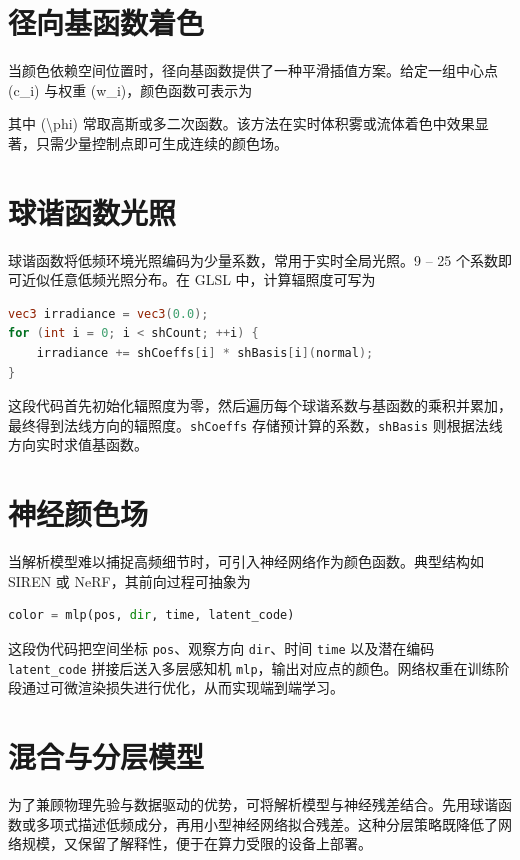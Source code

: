 \section{径向基函数着色}
当颜色依赖空间位置时，径向基函数提供了一种平滑插值方案。给定一组中心点 (c\_{}i) 与权重 (w\_{}i)，颜色函数可表示为\par
[ C(p) = \textbackslash{}sum\_{}\{{}i\}{} w\_{}i \textbackslash{}phi(|p - c\_{}i|) ]\par
其中 (\textbackslash{}phi) 常取高斯或多二次函数。该方法在实时体积雾或流体着色中效果显著，只需少量控制点即可生成连续的颜色场。\par
\section{球谐函数光照}
球谐函数将低频环境光照编码为少量系数，常用于实时全局光照。9 – 25 个系数即可近似任意低频光照分布。在 GLSL 中，计算辐照度可写为\par
\begin{lstlisting}[language=glsl]
vec3 irradiance = vec3(0.0);
for (int i = 0; i < shCount; ++i) {
    irradiance += shCoeffs[i] * shBasis[i](normal);
}
\end{lstlisting}
这段代码首先初始化辐照度为零，然后遍历每个球谐系数与基函数的乘积并累加，最终得到法线方向的辐照度。\texttt{shCoeffs} 存储预计算的系数，\texttt{shBasis} 则根据法线方向实时求值基函数。\par
\section{神经颜色场}
当解析模型难以捕捉高频细节时，可引入神经网络作为颜色函数。典型结构如 SIREN 或 NeRF，其前向过程可抽象为\par
\begin{lstlisting}[language=python]
color = mlp(pos, dir, time, latent_code)
\end{lstlisting}
这段伪代码把空间坐标 \texttt{pos}、观察方向 \texttt{dir}、时间 \texttt{time} 以及潜在编码 \texttt{latent\_{}code} 拼接后送入多层感知机 \texttt{mlp}，输出对应点的颜色。网络权重在训练阶段通过可微渲染损失进行优化，从而实现端到端学习。\par
\section{混合与分层模型}
为了兼顾物理先验与数据驱动的优势，可将解析模型与神经残差结合。先用球谐函数或多项式描述低频成分，再用小型神经网络拟合残差。这种分层策略既降低了网络规模，又保留了解释性，便于在算力受限的设备上部署。\par
